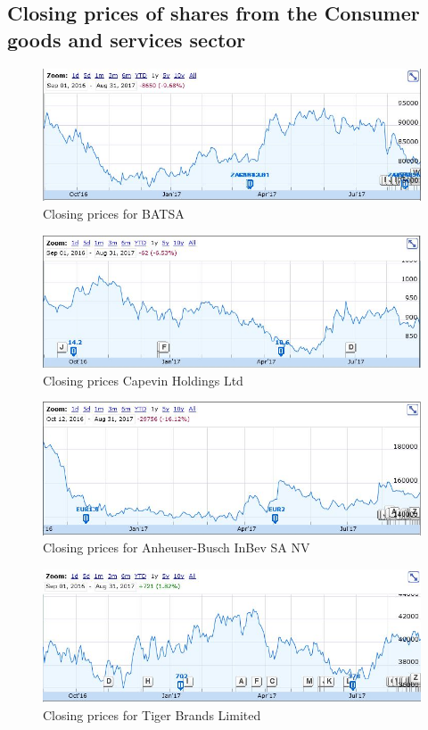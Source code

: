 \documentclass[letterpaper, 10 pt, conference]{ieeeconf}  %
\begin{document}
\label{sec:flowChart}

\subsection{Closing prices of shares from the Consumer goods and services sector}

\begin{figure}[h!]
\centering
\includegraphics[scale=0.43]{BATSA.JPG}
\caption{Closing prices for BATSA \cite{BATSA}}
\label{fig:BASTA}
\end{figure}

\begin{figure}[h!]
\centering
\includegraphics[scale=0.43]{capevin.JPG}
\caption{Closing prices Capevin Holdings Ltd \cite{capevin}}
\label{fig:capevin}
\end{figure}

\begin{figure}[h!]
\centering
\includegraphics[scale=0.43]{inbev.JPG}
\caption{Closing prices for Anheuser-Busch InBev SA NV \cite{inbev}}
\label{fig:inbev}
\end{figure}

\begin{figure}[h!]
\centering
\includegraphics[scale=0.43]{TigerBrands.JPG}
\caption{Closing prices for Tiger Brands Limited \cite{tigerBrands}}
\label{fig:tigerBrands}
\end{figure}


\label{sec:ClosingPrices}
\end{document}
